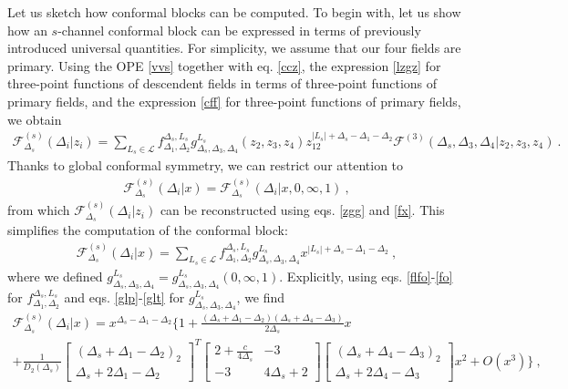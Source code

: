 \documentclass[12pt, a4paper, notitlepage, twoside]{report}
\numberwithin{equation}{section}
\theoremstyle{break}
\begin{document}
Let us sketch how conformal blocks can be computed. 
To begin with, let us show how an $s$-channel conformal block can be expressed in terms of previously introduced universal quantities.
For simplicity, we assume that our four fields are primary.
Using the OPE \eqref{vvs} together with eq. \eqref{ccz}, the expression \eqref{lzgz} for three-point functions of descendent fields in terms of three-point functions of primary fields, and the expression \eqref{cff} for three-point functions of primary fields, we obtain
\begin{align}
 \mathcal{F}^{(s)}_{\Delta_s}(\Delta_i|z_i) = \sum_{L_s\in\mathcal{L}} f_{\Delta_1,\Delta_2}^{\Delta_s,L_s} g^{L_s}_{\Delta_s,\Delta_3,\Delta_4}(z_2,z_3,z_4)z_{12}^{|L_s|+\Delta_s-\Delta_1-\Delta_2}\mathcal{F}^{(3)}(\Delta_s,\Delta_3,\Delta_4|z_2,z_3,z_4)\ .
\end{align}
Thanks to global conformal symmetry, we can restrict our attention to 
\begin{align}
 \mathcal{F}^{(s)}_{\Delta_s}(\Delta_i|x)=\mathcal{F}^{(s)}_{\Delta_s}(\Delta_i|x,0,\infty,1)\ ,
\end{align}
from which $\mathcal{F}^{(s)}_{\Delta_s}(\Delta_i|z_i)$ can be reconstructed using eqs. \eqref{zgg} and \eqref{fx}.
This simplifies the computation of the conformal block:
\begin{align}
 \mathcal{F}^{(s)}_{\Delta_s}(\Delta_i|x) = \sum_{L_s\in\mathcal{L}} f_{\Delta_1,\Delta_2}^{\Delta_s,L_s} g^{L_s}_{\Delta_s,\Delta_3,\Delta_4}x^{|L_s|+\Delta_s-\Delta_1-\Delta_2}\ ,
\label{gsd}
\end{align}
where we defined $g^{L_s}_{\Delta_s,\Delta_3,\Delta_4} = g^{L_s}_{\Delta_s,\Delta_3,\Delta_4}(0,\infty,1)$.
Explicitly, using eqs. \eqref{flfo}-\eqref{fo} for $f_{\Delta_1,\Delta_2}^{\Delta_s,L_s}$ and eqs. \eqref{glp}-\eqref{glt} for $g^{L_s}_{\Delta_s,\Delta_3,\Delta_4}$, we find 
\begin{multline}
 \mathcal{F}^{(s)}_{\Delta_s}(\Delta_i|x) 
= x^{\Delta_s - \Delta_1 - \Delta_2}\Bigg\{ 1 
+ \frac{(\Delta_s+\Delta_1-\Delta_2)(\Delta_s+\Delta_4-\Delta_3)}{2\Delta_s} x  
\\
+ \frac{1}{D_2(\Delta_s)}
\begin{bmatrix} (\Delta_s+\Delta_1-\Delta_2)_2 \\ \Delta_s+2\Delta_1-\Delta_2 \end{bmatrix}^T
\begin{bmatrix} 2+\frac{c}{4\Delta_s} & -3 \\ -3 & 4\Delta_s+2 \end{bmatrix}
\begin{bmatrix} (\Delta_s+\Delta_4-\Delta_3)_2 \\ \Delta_s+2\Delta_4-\Delta_3 \end{bmatrix}
 x^2 + O(x^3)\Bigg\}\ ,
\end{multline}
\end{document}
